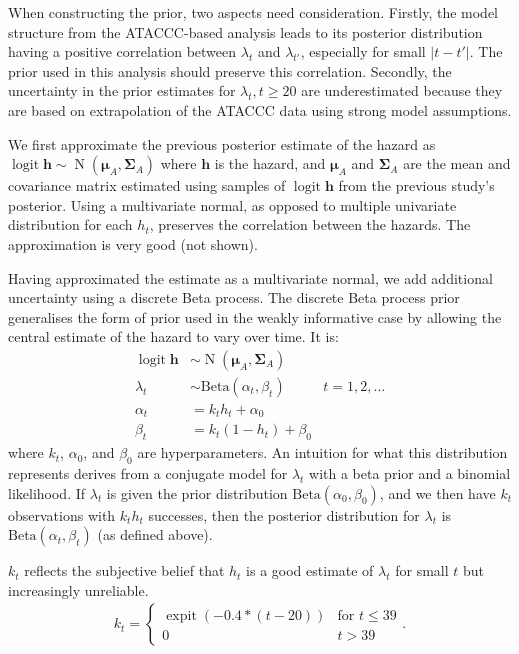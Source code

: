 \documentclass[12pt]{article}
\def\dist{\sim}
\DeclareMathOperator{\logit}{logit}
\DeclareMathOperator{\MNorm}{N}
\DeclareMathOperator{\expit}{expit}
\newcommand\matr{\bm}
\renewcommand{\vec}[1]{\bm{#1}}
\begin{document}
When constructing the prior, two aspects need consideration.
Firstly, the model structure from the ATACCC-based analysis leads to its posterior distribution having a positive correlation between $\lambda_t$ and $\lambda_{t'}$, especially for small $|t-t'|$.
The prior used in this analysis should preserve this correlation.
Secondly, the uncertainty in the prior estimates for $\lambda_t, t\geq20$ are underestimated because they are based on extrapolation of the ATACCC data using strong model assumptions.

We first approximate the previous posterior estimate of the hazard as $\logit{\vec{h}} \dist \MNorm(\vec{\mu}_A, \matr{\Sigma}_A)$ where $\vec{h}$ is the hazard, and $\vec{\mu}_A$ and $\matr{\Sigma}_A$ are the mean and covariance matrix estimated using samples of $\logit{\vec{h}}$ from the previous study's posterior.
Using a multivariate normal, as opposed to multiple univariate distribution for each $h_t$, preserves the correlation between the hazards.
The approximation is very good (not shown).

Having approximated the estimate as a multivariate normal, we add additional uncertainty using a discrete Beta process.
The discrete Beta process prior~\citep{ibrahimBayesian,sunStatisticala} generalises the form of prior used in the weakly informative case by allowing the central estimate of the hazard to vary over time.
It is:
\begin{align}
  \logit \vec{h} &\dist \MNorm(\vec{\mu}_A, \matr{\Sigma}_A) \\
  \lambda_t &\dist \text{Beta}(\alpha_t, \beta_t) &t = 1, 2, \dots \\
  \alpha_t &= k_t h_t + \alpha_0 \\
  \beta_t &= k_t (1 - h_t) + \beta_0
\end{align}
where $k_t$, $\alpha_0$, and $\beta_0$ are hyperparameters.
An intuition for what this distribution represents derives from a conjugate model for $\lambda_t$ with a beta prior and a binomial likelihood.
If $\lambda_t$ is given the prior distribution $\text{Beta}(\alpha_0, \beta_0)$, and we then have $k_t$ observations with $k_t h_t$ successes, then the posterior distribution for $\lambda_t$ is $\text{Beta}(\alpha_t, \beta_t)$ (as defined above).

$k_t$ reflects the subjective belief that $h_t$ is a good estimate of $\lambda_t$ for small $t$ but increasingly unreliable.
\begin{align}
k_t = \begin{cases}
  \expit(-0.4 * (t - 20)) &\text{for $t \leq 39$} \\
  0 &t > 39
\end{cases}.
\end{align}
\end{document}
